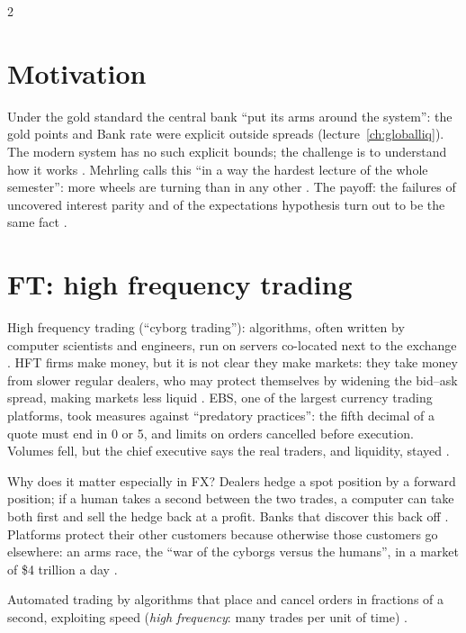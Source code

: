 \begin{paracol}{2}
\section*{Motivation}
Under the gold standard the central bank ``put its arms around the system'': the gold points and Bank rate were explicit outside spreads (lecture~\ref{ch:globalliq}).
The modern system has no such explicit bounds; the challenge is to understand how it works . Mehrling calls this ``in a way the hardest
lecture of the whole semester'': more wheels are turning than in any other . The payoff: the failures of uncovered interest parity and of the
expectations hypothesis turn out to be the same fact .

\section{FT: high frequency trading}\label{sec:fx-ft}

\begin{casestudy}
High frequency trading (``cyborg trading''): algorithms, often written by computer scientists and engineers, run on servers co-located next to the exchange
. HFT firms make money, but it is not clear they make markets: they take money from slower regular dealers, who may
protect themselves by widening the bid--ask spread, making markets less liquid . EBS, one of the largest currency trading platforms, took measures
against ``predatory practices'': the fifth decimal of a quote must end in 0 or 5, and limits on orders cancelled before execution. Volumes fell, but the chief
executive says the real traders, and liquidity, stayed .
\end{casestudy}

Why does it matter especially in FX? Dealers hedge a spot position by a forward position; if a human takes a second between the two trades, a computer can take
both first and sell the hedge back at a profit. Banks that discover this back off . Platforms protect their other
customers because otherwise those customers go elsewhere: an arms race, the ``war of the cyborgs versus the humans'', in a market of \$4 trillion a day
.

\begin{definition}
Automated trading by algorithms that place and cancel orders in fractions of a second, exploiting speed (\emph{high frequency}: many trades per unit of time)
.
\end{definition}


\end{paracol}
